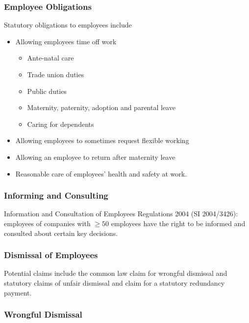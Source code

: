 \documentclass[
]{article}
\providecommand{\tightlist}{%
  \setlength{\itemsep}{0pt}\setlength{\parskip}{0pt}}
\begin{document}
\hypertarget{employee-obligations}{%
\subsubsection{Employee Obligations}\label{employee-obligations}}

Statutory obligations to employees include

\begin{itemize}
\tightlist
\item
  Allowing employees time off work

  \begin{itemize}
  \tightlist
  \item
    Ante-natal care
  \item
    Trade union duties
  \item
    Public duties
  \item
    Maternity, paternity, adoption and parental leave
  \item
    Caring for dependents
  \end{itemize}
\item
  Allowing employees to sometimes request flexible working
\item
  Allowing an employee to return after maternity leave
\item
  Reasonable care of employees' health and safety at work.
\end{itemize}

\hypertarget{informing-and-consulting}{%
\subsubsection{Informing and
Consulting}\label{informing-and-consulting}}

Information and Consultation of Employees Regulations 2004 (SI
2004/3426): employees of companies with \(\geq 50\) employees have the
right to be informed and consulted about certain key decisions.

\hypertarget{dismissal-of-employees}{%
\subsubsection{Dismissal of Employees}\label{dismissal-of-employees}}

Potential claims include the common law claim for wrongful dismissal and
statutory claims of unfair dismissal and claim for a statutory
redundancy payment.

\hypertarget{wrongful-dismissal}{%
\subsubsection{Wrongful Dismissal}\label{wrongful-dismissal}}
\end{document}
